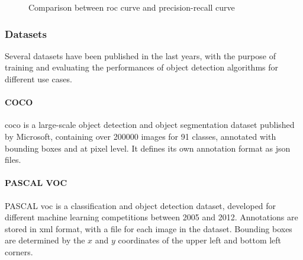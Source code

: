 \documentclass[%
    corpo=12pt,
    twoside,
    stile=classica,   
    tipotesi=magistrale,
    evenboxes,
    english,
	numerazioneromana,
]{toptesi}
\begin{document}
\begin{figure}[ht]
	\centering
	\caption{Comparison between \gls{roc} curve and precision-recall curve}
	\label{fig:roc_map}
\end{figure}

\subsubsection{Datasets}\label{sec:datasets}
Several datasets have been published in the last years, with the purpose of training and evaluating the performances of object detection algorithms for different use cases.

\paragraph{COCO}\label{sec:coco}
\gls{coco} is a large-scale object detection and object segmentation dataset published by Microsoft, containing over 200000 images for 91 classes, annotated with bounding boxes and at pixel level\cite{lin2015microsoft}. It defines its own annotation format as \acrshort{json} files.

\paragraph{PASCAL VOC}
PASCAL \gls{voc} is a classification and object detection dataset, developed for different machine learning competitions between 2005 and 2012\cite{voc}. Annotations are stored in \acrshort{xml} format, with a file for each image in the dataset. Bounding boxes are determined by the $x$ and $y$ coordinates of the upper left and bottom left corners.
\end{document}
